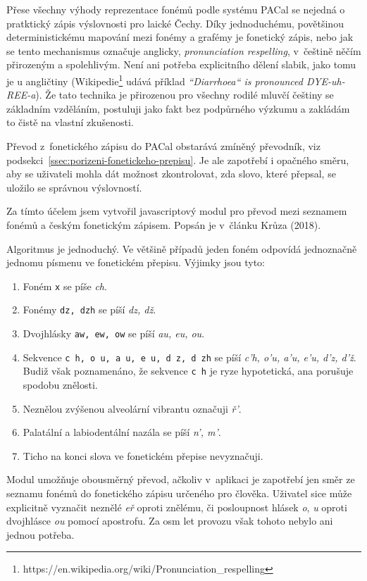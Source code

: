 Přese všechny výhody reprezentace fonémů podle systému PACal se nejedná o
pratktický zápis výslovnosti pro laické Čechy. Díky jednoduchému, povětšinou
deterministickému mapování mezi fonémy a grafémy je fonetický zápis, nebo jak
se tento mechanismus označuje anglicky, {\em pronunciation respelling},
v~češtině něčím přirozeným a spolehlivým. Není ani potřeba explicitního dělení
slabik, jako tomu je u angličtiny
(Wikipedie\footnote{https://en.wikipedia.org/wiki/Pronunciation\_respelling}
udává příklad {\em ``Diarrhoea`` is pronounced DYE-uh-REE-a}).
Že tato technika je přirozenou pro všechny rodilé mluvčí češtiny se základním vzděláním,
postuluji jako fakt bez podpůrného výzkumu a zakládám to čistě na vlastní
zkušenosti.

Převod z~fonetického zápisu do PACal obstarává zmíněný převodník, viz
podsekci~\ref{ssec:porizeni-fonetickeho-prepisu}. Je ale zapotřebí i opačného
směru, aby se uživateli mohla dát možnost zkontrolovat, zda slovo, které
přepsal, se uložilo se správnou výslovností.

Za tímto účelem jsem vytvořil javascriptový modul pro převod mezi seznamem
fonémů a českým fonetickým zápisem. Popsán je v~článku Krůza (2018)\cite{biblio:KrPhoneticTranscription2018}.

Algoritmus je jednoduchý. Ve většině případů jeden foném odpovídá jednoznačně
jednomu písmenu ve fonetickém přepisu. Výjimky jsou tyto:
\begin{enumerate}
\item{Foném \texttt{x} se píše {\em ch}.}
\item{Fonémy \texttt{dz, dzh} se píší {\em dz, dž}.}
\item{Dvojhlásky \texttt{aw, ew, ow} se píší {\em au, eu, ou}.}
\item{
    Sekvence \texttt{c h, o u, a u, e u, d z, d zh} se píší
    {\em c'h, o'u, a'u, e'u, d'z, d'ž}.
    Budiž však poznamenáno, že sekvence \texttt{c h} je ryze hypotetická, ana
    porušuje spodobu znělosti.
}
\item{
    Neznělou zvýšenou alveolární vibrantu označuji {\em ř'}.
}
\item{
    Palatální a labiodentální nazála se píší {\em n', m'}.
}
\item{Ticho na konci slova ve fonetickém přepise nevyznačuji.}
\end{enumerate}

Modul umožňuje obousměrný převod, ačkoliv v~aplikaci je zapotřebí jen směr ze seznamu fonémů do
fonetického zápisu určeného pro člověka. Uživatel sice může explicitně vyznačit
neznělé {\em eř} oproti znělému, či posloupnost hlásek {\em o}, {\em u} oproti
dvojhlásce {\em ou} pomocí apostrofu. Za osm let provozu však tohoto nebylo ani
jednou potřeba.

